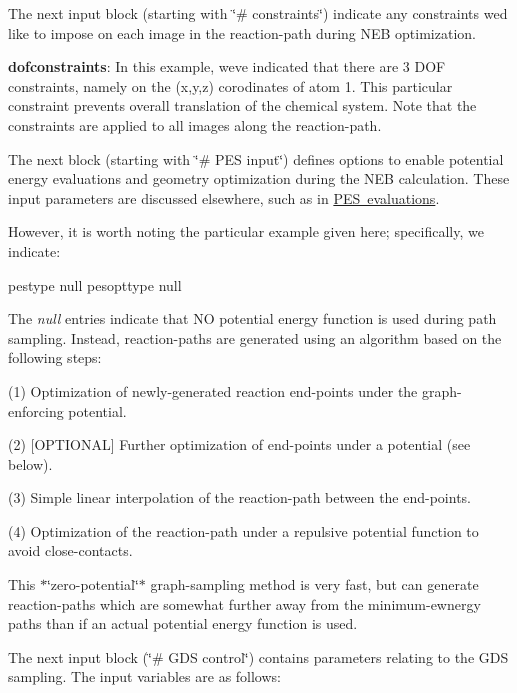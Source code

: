 The next input block (starting with \char`\"{}\# constraints\char`\"{}) indicate any constraints we\textquotesingle{}d like to impose on each image in the reaction-\/path during N\+EB optimization.


\begin{DoxyItemize}
\item {\bfseries dofconstraints}\+: In this example, we\textquotesingle{}ve indicated that there are 3 D\+OF constraints, namely on the (x,y,z) corodinates of atom 1. This particular constraint prevents overall translation of the chemical system. Note that the constraints are applied to all images along the reaction-\/path.
\end{DoxyItemize}

The next block (starting with \char`\"{}\# P\+E\+S input\char`\"{}) defines options to enable potential energy evaluations and geometry optimization during the N\+EB calculation. These input parameters are discussed elsewhere, such as in \mbox{\hyperlink{_p_e_s}{P\+ES evaluations}}.

However, it is worth noting the particular example given here; specifically, we indicate\+: \begin{DoxyVerb}pestype  null
pesopttype  null
\end{DoxyVerb}


The {\itshape null} entries indicate that NO potential energy function is used during path sampling. Instead, reaction-\/paths are generated using an algorithm based on the following steps\+:

(1) Optimization of newly-\/generated reaction end-\/points under the graph-\/enforcing potential.

(2) \mbox{[}O\+P\+T\+I\+O\+N\+AL\mbox{]} Further optimization of end-\/points under a potential (see below).

(3) Simple linear interpolation of the reaction-\/path between the end-\/points.

(4) Optimization of the reaction-\/path under a repulsive potential function to avoid close-\/contacts.

This $\ast$\char`\"{}zero-\/potential\char`\"{}$\ast$ graph-\/sampling method is very fast, but can generate reaction-\/paths which are somewhat further away from the minimum-\/ewnergy paths than if an actual potential energy function is used.

The next input block (\char`\"{}\# G\+D\+S control\char`\"{}) contains parameters relating to the G\+DS sampling. The input variables are as follows\+:


